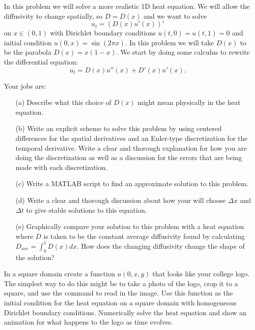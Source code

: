 \begin{problem}
    In this problem we will solve a more realistic 1D heat equation.  We will allow the
    diffusivity to change spatially, so $D = D(x)$ and we want to solve
    \[ u_t = \left( D(x) u'(x) \right)' \]
    on $x \in (0,1)$ with Dirichlet boundary conditions $u(t,0) = u(t,1) = 0$ and initial
    condition $u(0,x) = \sin(2 \pi x)$. In this problem we will take $D(x)$ to be the
    parabola $D(x)= x(1-x)$. We start by doing some calculus to rewrite the
    differential equation:
    \[ u_t = D(x) u''(x) + D'(x) u'(x). \]

    Your jobs are:
    \begin{enumerate}
        \item[(a)] Describe what this choice of $D(x)$ might mean physically in the heat
            equation.
        \item[(b)] Write an explicit scheme to solve this problem by using centered differences
            for the spatial derivatives and an Euler-type discretization for the temporal
            derivative.  Write a clear and thorough explanation for how you are doing the
            discretization as well as a discussion for the errors that are being made with
            each discretization.
        \item[(c)] Write a MATLAB script to find an approximate solution to this problem.
        \item[(d)] Write a clear and thorough discussion about how your will choose $\Delta x$
            and $\Delta t$ to give stable solutions to this equation.
        \item[(e)] Graphically compare your solution to this problem with a heat equation
            where $D$ is taken to be the constant average diffusivity found by calculating
            $D_{ave} = \int_0^1 D(x) dx.$  How does the changing diffusivity change the
            shape of the solution?
    \end{enumerate}

\end{problem}

\begin{problem}
    In a square domain create a function $u(0,x,y)$ that looks like your college logo.
    The simplest way to do this might be to take a photo of the logo, crop it to a square,
    and use the  command to read in the image.  Use this function as the
    initial condition for the heat equation on a square domain with homogeneous Dirichlet
    boundary conditions.  Numerically solve the heat equation and show an animation for
    what happens to the logo as time evolves.
\end{problem}

